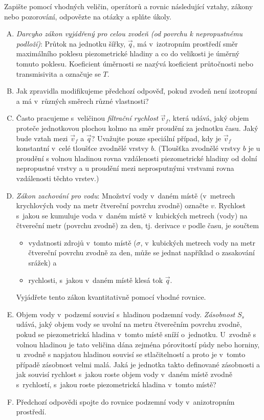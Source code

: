 Zapište pomocí vhodných veličin, operátorů a rovnic následující vztahy, zákony nebo pozorování,
odpovězte na otázky a splňte úkoly.
\begin{enumerate}[A)]
\item \textit{Darcyho zákon vyjádřený pro celou zvodeň (od povrchu k nepropustnému podloží)}:
  Průtok na jednotku šířky, $\vec q$, má v izotropním prostředí směr
  maximálního poklesu piezometrické hladiny a co do velikosti je
  úměrný tomuto poklesu. Koeficient úměrnosti se nazývá koeficient
  průtočnosti nebo transmisivita a označuje se $T$.
\item Jak zpravidla modifikujeme předchozí odpověď, pokud zvodeň není
  izotropní a má v různých směrech různé vlastnosti?
\item Často pracujeme s veličinou \textit{filtrační rychlost} $\vec v_f$, která
  udává, jaký objem proteče jednotkovou plochou kolmo na směr proudění
  za jednotku času. Jaký bude vztah mezi $\vec v_f$ a $\vec q$? Uvažujte pouze
  speciální případ, kdy je $\vec v_f$ konstantní v celé tloušťce zvodnělé
  vrstvy $b$. (Tloušťka zvodnělé vrstvy $b$ je u proudění s volnou hladinou rovna vzdálenosti piezometrické hladiny od dolní nepropustné vrstvy a u proudění mezi neprosputnými vrstvami rovna vzdálenosti těchto vrstev.) 
  \stranka
\item \textit{Zákon zachování pro vodu}: Množství vody v daném místě (v metrech krychlových vody na metr čtvereční povrchu zvodně) označte $v$. Rychlost s jakou se kumuluje voda v daném místě v kubických
  metrech (vody) na čtvereční metr (povrchu zvodně) za den, tj. derivace $v$ podle času, je
  součtem
  \begin{itemize} pt
  \item vydatnosti zdrojů v tomto místě ($\sigma$, v kubických
    metrech vody na metr čtvereční povrchu zvodně za den, může se jednat například o zasakování srážek) a
  \item rychlosti, s jakou v daném místě klesá tok $\vec q$.
\end{itemize}
  Vyjádřete tento zákon kvantitativně pomocí vhodné rovnice.
\item Objem vody v podzemí souvisí s hladinou podzemní
  vody. \textit{Zásobnost} $S_s$ udává, jaký objem vody se uvolní na
  metru čtverečním povrchu zvodně, pokud se piezometrická hladina
  v tomto místě sníží o jednotku. U zvodně s volnou hladinou je tato
  veličina dána zejména pórovitostí půdy nebo horniny, u zvodně s
  napjatou hladinou souvisí se stlačitelností a proto je v tomto
  případě zásobnost velmi malá. Jaká je jednotka takto definované
  zásobnosti a jak souvisí rychlost s jakou roste objem vody v daném
  místě zvodně s rychlostí, s jakou roste piezometrická hladina
  v tomto místě?
\item Předchozí odpovědi spojte do rovnice 
  podzemní vody v anizotropním prostředí.
\end{enumerate}

